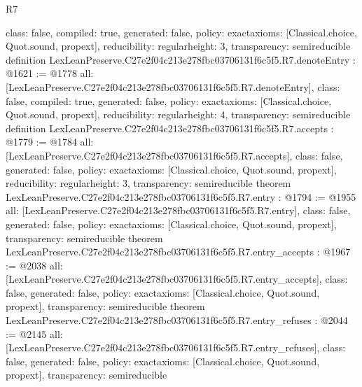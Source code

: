 \begin{lexlean}{R7}
\begin{coremodule}
{  class: false,
  compiled: true,
  generated: false,
  policy: exact{axioms: [Classical.choice, Quot.sound, propext]},
  reducibility: regular{height: 3},
  transparency: semireducible
}
definition LexLeanPreserve.C27e2f04c213e278fbc03706131f6c5f5.R7.denoteEntry : @1621 := @1778 {
  all: [LexLeanPreserve.C27e2f04c213e278fbc03706131f6c5f5.R7.denoteEntry],
  class: false,
  compiled: true,
  generated: false,
  policy: exact{axioms: [Classical.choice, Quot.sound, propext]},
  reducibility: regular{height: 4},
  transparency: semireducible
}
definition LexLeanPreserve.C27e2f04c213e278fbc03706131f6c5f5.R7.accepts : @1779 := @1784 {
  all: [LexLeanPreserve.C27e2f04c213e278fbc03706131f6c5f5.R7.accepts],
  class: false,
  generated: false,
  policy: exact{axioms: [Classical.choice, Quot.sound, propext]},
  reducibility: regular{height: 3},
  transparency: semireducible
}
theorem LexLeanPreserve.C27e2f04c213e278fbc03706131f6c5f5.R7.entry : @1794 := @1955 {
  all: [LexLeanPreserve.C27e2f04c213e278fbc03706131f6c5f5.R7.entry],
  class: false,
  generated: false,
  policy: exact{axioms: [Classical.choice, Quot.sound, propext]},
  transparency: semireducible
}
theorem LexLeanPreserve.C27e2f04c213e278fbc03706131f6c5f5.R7.entry_accepts : @1967 := @2038 {
  all: [LexLeanPreserve.C27e2f04c213e278fbc03706131f6c5f5.R7.entry_accepts],
  class: false,
  generated: false,
  policy: exact{axioms: [Classical.choice, Quot.sound, propext]},
  transparency: semireducible
}
theorem LexLeanPreserve.C27e2f04c213e278fbc03706131f6c5f5.R7.entry_refuses : @2044 := @2145 {
  all: [LexLeanPreserve.C27e2f04c213e278fbc03706131f6c5f5.R7.entry_refuses],
  class: false,
  generated: false,
  policy: exact{axioms: [Classical.choice, Quot.sound, propext]},
  transparency: semireducible
}


\end{coremodule}
\end{lexlean}
